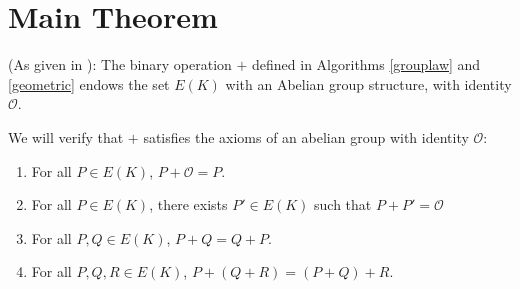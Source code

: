 \documentclass[]{math_paper}
\begin{document}
\section{Main Theorem} \label{sec:thm}
\begin{maintheorem}(As given in \cite{stein2008elementary}):
    \label{thm:main}
    The binary operation $+$ defined in Algorithms \ref{grouplaw} and \ref{geometric} endows the set $E(K)$ with an Abelian group structure, with identity $\mathcal{O}$.
\end{maintheorem}
We will verify that $+$ satisfies the axioms of an abelian group with identity $\mathcal{O}$:
\begin{enumerate} [label = (\roman*)]
    \item For all $P \in E(K)$, $P + \mathcal{O} = P$.
    \item For all $P \in E(K)$, there exists $P' \in E(K)$ such that $P + P' = \mathcal{O}$
    \item For all $P, Q \in E(K)$, $P + Q = Q + P$.
    \item For all $P, Q, R \in E(K)$, $P + (Q + R) = (P + Q) + R$.
\end{enumerate}
\end{document}
